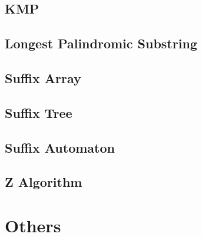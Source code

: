 \documentclass[11pt,twocolumn,a4paper]{article}
\begin{document}
\subsection{KMP}


\subsection{Longest Palindromic Substring}


\subsection{Suffix Array}


\subsection{Suffix Tree}


\subsection{Suffix Automaton}


\subsection{Z Algorithm}



\newpage
\section{Others}
\end{document}
